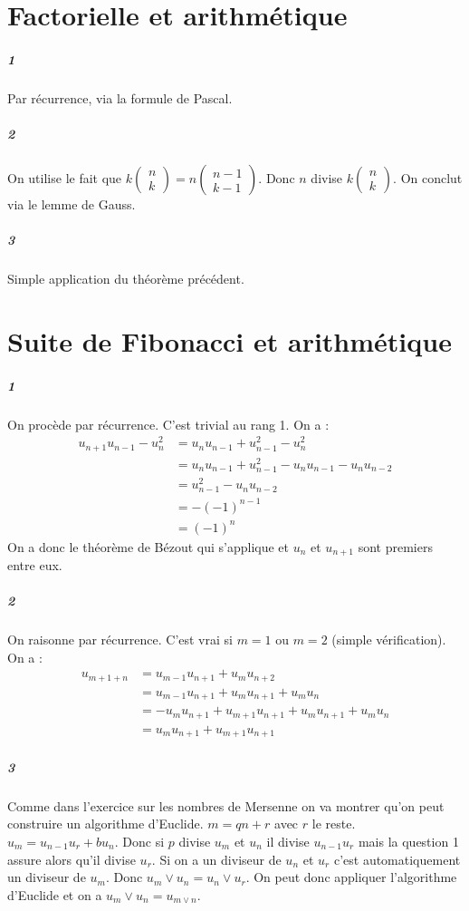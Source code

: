 \documentclass[10pt,a4paper]{article}
\begin{document}
\section{Factorielle et arithmétique}
\subparagraph{1}Par récurrence, via la formule de Pascal.
\subparagraph{2}On utilise le fait que $k\left( \begin{matrix}n \\k \end{matrix}\right)=n\left( \begin{matrix}n-1 \\k-1 \end{matrix}\right)$. Donc $n$ divise $k \left( \begin{matrix}n \\k \end{matrix}\right)$. On conclut via le lemme de Gauss.
\subparagraph{3}Simple application du théorème précédent.
\section{Suite de Fibonacci et arithmétique}
\subparagraph{1}On procède par récurrence. C'est trivial au rang 1. On a :
\begin{equation}
\begin{aligned}
u_{n+1}u_{n-1}-u_n^2&=u_n u_{n-1}+u_{n-1}^2-u_n^2 \\
&=u_n u_{n-1} + u_{n-1}^2-u_n u_{n-1}-u_nu_{n-2} \\
&=u_{n-1}^2-u_nu_{n-2}\\
&=-(-1)^{n-1}\\
&=(-1)^n
\end{aligned}
\end{equation}
On a donc le théorème de Bézout qui s'applique et $u_n$ et $u_{n+1}$ sont premiers entre eux.
\subparagraph{2}On raisonne par récurrence. C'est vrai si $m=1$ ou $m=2$ (simple vérification). On a :
\begin{equation}
\begin{aligned}
u_{m+1+n}&=u_{m-1}u_{n+1}+u_m u_{n+2}\\
&=u_{m-1}u_{n+1}+u_mu_{n+1} + u_m u_n\\
&=-u_m u_{n+1} +u_{m+1} u_{n+1} +u_mu_{n+1} + u_m u_n\\
&=u_m u_{n+1}+u_{m+1} u_{n+1}
\end{aligned}
\end{equation}
\subparagraph{3}Comme dans l'exercice sur les nombres de Mersenne on va montrer qu'on peut construire un algorithme d'Euclide. $m=qn+r$ avec $r$ le reste. $u_m=u_{n-1}u_r+bu_n$. Donc si $p$ divise $u_m$ et $u_n$ il divise $u_{n-1}u_r$ mais la question 1 assure alors qu'il divise $u_r$. Si on a un diviseur de $u_n$ et $u_r$ c'est automatiquement un diviseur de $u_m$. Donc $u_m \vee u_n = u_n \vee u_r$. On peut donc appliquer l'algorithme d'Euclide et on a $u_m \vee u_n =u_{m \vee n}$.
\end{document}

